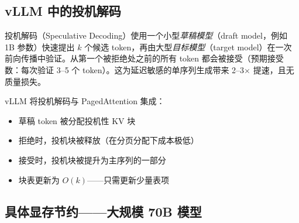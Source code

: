 \subsection{vLLM 中的投机解码}
\label{speculative-decoding-integration}

投机解码（Speculative Decoding）使用一个小型\emph{草稿模型}（draft model，例如 1B 参数）快速提出 $k$ 个候选 token，再由大型\emph{目标模型}（target model）在一次前向传播中验证。从第一个被拒绝处之前的所有 token 都会被接受（预期接受数：每次验证 3--5 个 token）。这为延迟敏感的单序列生成带来 2--3$\times$ 提速，且无质量损失。

vLLM 将投机解码与 PagedAttention 集成：

\begin{itemize}
  \item 草稿 token 被分配投机性 KV 块
  \item 拒绝时，投机块被释放（在分页分配下成本极低）
  \item 接受时，投机块被提升为主序列的一部分
  \item 块表更新为 $O(k)$——只需更新少量表项
\end{itemize}

\subsection{具体显存节约——大规模 70B 模型}
\label{concrete-memory-savings-70b-model-at-scale}

